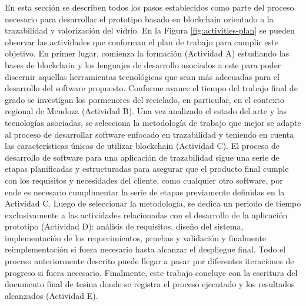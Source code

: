 En esta sección se describen todos los pasos establecidos como parte del proceso necesario para desarrollar el prototipo basado en blockchain orientado a la trazabilidad y valorización del vidrio. En la Figura \ref{fig:activities-plan} se pueden observar las actividades que conforman el plan de trabajo para cumplir este objetivo. En primer lugar, comienza la formación (Actividad A) estudiando las bases de blockchain y los lenguajes de desarrollo asociados a este para poder discernir aquellas herramientas tecnológicas que sean más adecuadas para el desarrollo del software propuesto. Conforme avance el tiempo del trabajo final de grado se investigan los pormenores del reciclado, en particular, en el contexto regional de Mendoza (Actividad B). Una vez analizado el estado del arte y las tecnologías asociadas, se selecciona la metodología de trabajo que mejor se adapte al proceso de desarrollar software enfocado en trazabilidad y teniendo en cuenta las características únicas de utilizar blockchain (Actividad C). El proceso de desarrollo de software para una aplicación de trazabilidad sigue una serie de etapas planificadas y estructuradas para asegurar que el producto final cumple con los requisitos y necesidades del cliente, como cualquier otro software, por ende es necesario cumplimentar la serie de etapas previamente definidas en la Actividad C. Luego de seleccionar la metodología, se dedica un periodo de tiempo exclusivamente a las actividades relacionadas con el desarrollo de la aplicación prototipo (Actividad D): análisis de requisitos, diseño del sistema, implementación de los requerimientos, pruebas y validación y finalmente reimplementación si fuera necesario hasta alcanzar el despliegue final. Todo el proceso anteriormente descrito puede llegar a pasar por diferentes iteraciones de progreso si fuera necesario. Finalmente, este trabajo concluye con la escritura del documento final de tesina donde se registra el proceso ejecutado y los resultados alcanzados (Actividad E).

